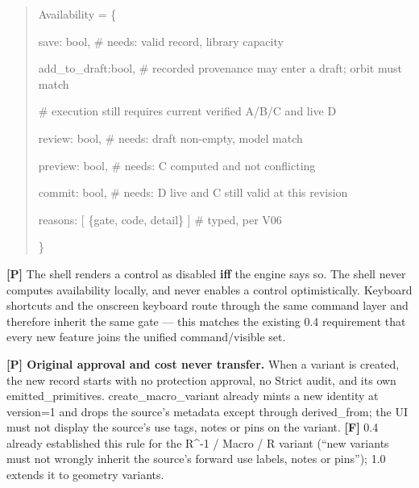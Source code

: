 \documentclass[10pt,a4paper]{article}
\begin{document}
\begin{quote}\small\codefont\raggedright\color{ink}
Availability = \allowbreak{}\{\par
  save:\allowbreak{}        bool,\allowbreak{}   \# needs:\allowbreak{} valid record,\allowbreak{} library capaci\allowbreak{}ty\par
  add\_\allowbreak{}to\_\allowbreak{}draft:\allowbreak{}bool,\allowbreak{}   \# recorded p\allowbreak{}rovenance may e\allowbreak{}nter a draft; o\allowbreak{}rbit must match\allowbreak{}\par
               \allowbreak{}       \# execut\allowbreak{}ion still requi\allowbreak{}res current ver\allowbreak{}ified A/\allowbreak{}B/\allowbreak{}C and live D\par
  review:\allowbreak{}      bool,\allowbreak{}   \# needs:\allowbreak{} draft non-\allowbreak{}empty,\allowbreak{} model match\par
  preview:\allowbreak{}     bool,\allowbreak{}   \# needs:\allowbreak{} C computed and\allowbreak{} not conflictin\allowbreak{}g\par
  commit:\allowbreak{}      bool,\allowbreak{}   \# needs:\allowbreak{} D live and C s\allowbreak{}till valid at t\allowbreak{}his revision\par
  reasons:\allowbreak{}     [ \{gate,\allowbreak{} code,\allowbreak{} detail\} ]   \# \allowbreak{}typed,\allowbreak{} per V06\par
\}\par\end{quote}

\textbf{{[}P{]}} The shell renders a control as disabled \textbf{iff} the engine says so. The shell never computes availability locally, and never enables a control optimistically. Keyboard shortcuts and the onscreen keyboard route through the same command layer and therefore inherit the same gate --- this matches the existing 0.4 requirement that every new feature joins the unified command/visible set.

\textbf{{[}P{]} Original approval and cost never transfer.} When a variant is created, the new record starts with no protection approval, no Strict audit, and its own {\codefont emitted\_\allowbreak{}primitives}. {\codefont create\_\allowbreak{}macro\_\allowbreak{}variant} already mints a new identity at {\codefont version=1} and drops the source's metadata except through {\codefont derived\_\allowbreak{}from}; the UI must not display the source's use tags, notes or pins on the variant. \textbf{{[}F{]}} 0.4 already established this rule for the {\codefont R\textasciicircum{}-\allowbreak{}1 /\allowbreak{} Macro /\allowbreak{} R} variant (``new variants must not wrongly inherit the source's forward use labels, notes or pins''); 1.0 extends it to geometry variants.
\end{document}
